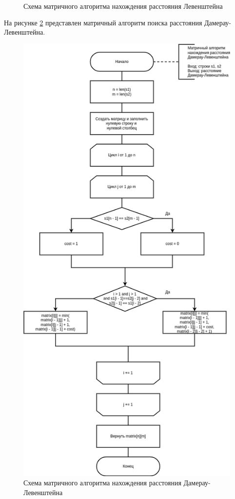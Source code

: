 \begin{figure}[H]
\begin{center}
	\end{center}
	\captionsetup{justification=centering}
	\caption{Схема матричного алгоритма нахождения расстояния Левенштейна}
	\label{img:matrix}
\end{figure}

На рисунке \ref{img:dl_matrix} представлен матричный алгоритм поиска расстояния Дамерау-Левенштейна.

\begin{figure}[H]
	\begin{center}
		\includegraphics[scale=0.45]{img/dl_matrix.png}
	\end{center}
	\captionsetup{justification=centering}
	\caption{Схема матричного алгоритма нахождения расстояния Дамерау-Левенштейна}
	\label{img:dl_matrix}
\end{figure}

